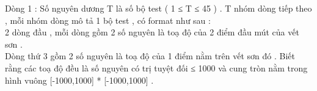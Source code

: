 Dòng 1 : Số nguyên dương T là số bộ test ( 1 ≤ T ≤ 45 ) . T nhóm dòng tiếp theo , mỗi nhóm dòng mô tả 1 bộ test , có format như sau :   
\\   2 dòng đầu , mỗi dòng gồm 2 số nguyên là toạ độ của 2 điểm đầu mút của vết sơn .   
\\   Dòng thứ 3 gồm 2 số nguyên là toạ độ của 1 điểm nằm trên vết sơn đó . Biết rằng các toạ độ đều là số nguyên có trị tuyệt đối ≤ 1000 và cung tròn nằm trong hình vuông [-1000,1000] * [-1000,1000] .